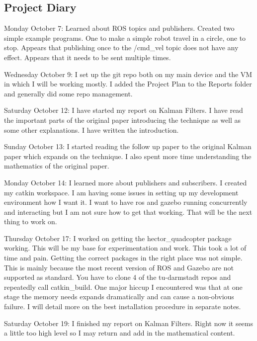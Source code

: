 \documentclass[]{../resources/final_report}
\begin{document}
\begin{appendices}

  \chapter{Project Diary}
  
  Monday October 7: Learned about ROS topics and publishers. Created two simple example programs. One to make a simple robot travel in a circle, one to stop. Appears that publishing once to the /cmd\_vel topic does not have any effect. Appears that it needs to be sent multiple times.
  
  Wednesday October 9: I set up the git repo both on my main device and the VM in which I will be working mostly. I added the Project Plan to the Reports folder and generally did some repo management.
  
  Saturday October 12: I have started my report on Kalman Filters. I have read the important parts of the original paper introducing the technique as well as some other explanations. I have written the introduction.
  
  Sunday October 13: I started reading the follow up paper to the original Kalman paper which expands on the technique. I also spent more time understanding the mathematics of the original paper.
  
  Monday October 14: I learned more about publishers and subscribers. I created my catkin workspace. I am having some issues in setting up my development environment how I want it. I want to have ros and gazebo running concurrently and interacting but I am not sure how to get that working. That will be the next thing to work on.
  
  Thursday October 17: I worked on getting the hector\_quadcopter package working. This will be my base for experimentation and work. This took a lot of time and pain. Getting the correct packages in the right place was not simple. This is mainly because the most recent version of ROS and Gazebo are not supported as standard. You have to clone 4 of the tu-darmstadt repos and repeatedly call catkin\_build. One major hiccup I encountered was that at one stage the memory needs expands dramatically and can cause a non-obvious failure. I will detail more on the best installation procedure in separate notes.
  
  Saturday October 19: I finished my report on Kalman Filters. Right now it seems a little too high level so I may return and add in the mathematical content.
  

\end{appendices}
\end{document}
